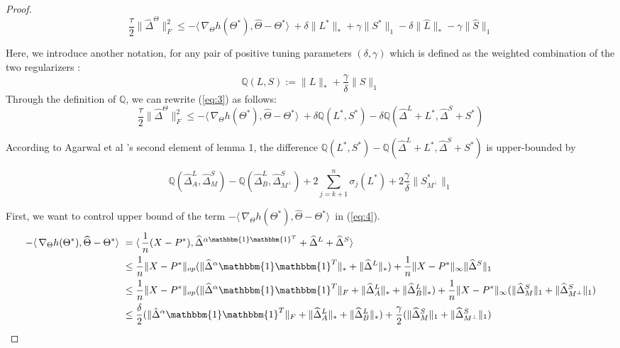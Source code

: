 \documentclass[AMS,STIX1COL]{WileyNJD-v2}
\begin{document}
{\begin{proof}
\begin{equation}\label{eq:3}
    \frac{\tau}{2}\|\widehat{\Delta}^{\Theta}\|_{F}^{2} \leq
    -\langle\,\nabla_{\Theta}h(\Theta^{*}),\widehat{\Theta}-\Theta^{*}\rangle\
    + \delta \|L^{*}\|_\ast + \gamma \|S^{*}\|_1
    - \delta \|\widehat{L}\|_\ast - \gamma \|\widehat{S}\|_1
\end{equation}

Here, we introduce another notation, for any pair of positive tuning parameters $(\delta,\gamma)$ which is defined as the weighted combination of the two regularizers :
\[
\mathbb{Q}(L,S)   := \|L\|_{*} + \frac{\gamma}{\delta}\|S\|_1
\]
Through the definition of $\mathbb{Q}$, we can rewrite (\ref{eq:3}) as follows:
\begin{equation}\label{eq:4}
    \frac{\tau}{2}\|\widehat{\Delta}^{\Theta}\|_{F}^{2} \leq
    -\langle\,\nabla_{\Theta}h(\Theta^{*}),\widehat{\Theta}-\Theta^{*}\rangle\
    + \delta \mathbb{Q}(L^{*},S^{*}) - \delta \mathbb{Q}(\widehat{\Delta}^L + L^{*},\widehat{\Delta}^S + S^{*})
\end{equation}

According to Agarwal et al \cite{agarwal2012noisy}'s second element of lemma 1,
the difference $\mathbb{Q}(L^*,S^*)- \mathbb{Q}(\widehat{\Delta}^L + L^{*},\widehat{\Delta}^S + S^{*})$ is upper-bounded by

\begin{equation}\label{eq:5}
    \mathbb{Q}(\widehat{\Delta}^L_{A},\widehat{\Delta}^S_{M}) - \mathbb{Q}(\widehat{\Delta}^L_{B},\widehat{\Delta}^S_{M^\perp})
    +2 \sum_{j=k+1}^{n} \sigma_{j}(L^*) + 2\frac{\gamma}{\delta}\|S^*_{M^\perp}\|_{1}
\end{equation}

First, we want to control upper bound of the term $-\langle\,\nabla_{\Theta}h(\Theta^{*}),\widehat{\Theta}-\Theta^{*} \rangle\,$
in (\ref{eq:4}).
\begin{align}
-\langle\,\nabla_{\Theta}h(\Theta^{*}),\widehat{\Theta}-\Theta^{*} \rangle\  \nonumber
&=\langle\, \frac{1}{n} (X - P^*), \widehat\Delta^{\alpha\mathbbm{1}\mathbbm{1}^T} + \widehat\Delta^{L} + \widehat\Delta^{S} \rangle\ \\ \nonumber
&\leq \frac{1}{n} \|X - P^*\|_{op}(\|\widehat{\Delta}^{\alpha}\mathbbm{1}\mathbbm{1}^T\|_\ast + \|\widehat{\Delta}^{L}\|_\ast) +  \frac{1}{n} \|X - P^*\|_{\infty}\|\widehat{\Delta}^{S}\|_{1} \\ \nonumber
&\leq \frac{1}{n} \|X - P^*\|_{op}(\|\widehat{\Delta}^{\alpha}\mathbbm{1}\mathbbm{1}^T\|_{F} + \|\widehat{\Delta}^{L}_{A}\|_\ast + \|\widehat{\Delta}^{L}_{B}\|_\ast) +
\frac{1}{n} \|X - P^*\|_{\infty}(\|\widehat{\Delta}^{S}_{M}\|_{1} +
\|\widehat{\Delta}^{S}_{M^{\perp}}\|_{1}) \\
&\leq \frac{\delta}{2}(\|\hat{\Delta}^{\alpha}\mathbbm{1}\mathbbm{1}^T\|_{F} + \|\widehat{\Delta}^{L}_{A}\|_\ast + \|\widehat{\Delta}^{L}_{B}\|_\ast) + \frac{\gamma}{2}(\|\widehat{\Delta}^{S}_{M}\|_{1} +
\|\widehat{\Delta}^{S}_{M^{\perp}}\|_{1})  \label{eq:10}
\end{align}


\end{proof}}
\end{document}
